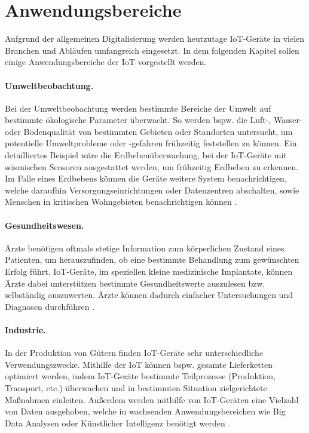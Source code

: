\section{Anwendungsbereiche}
Aufgrund der allgemeinen Digitalisierung werden heutzutage IoT-Geräte in 
vielen Branchen und Abläufen umfangreich eingesetzt. In dem folgenden Kapitel 
sollen einige Anwendungsbereiche der IoT vorgestellt werden. 

\paragraph{Umweltbeobachtung.}
Bei der Umweltbeobachtung werden bestimmte Bereiche der Umwelt auf bestimmte
ökologische Parameter überwacht.  So werden bspw. die Luft-, Wasser- oder
Bodenqualität von bestimmten Gebieten oder Standorten untersucht, um potentielle
Umweltprobleme oder -gefahren frühzeitig feststellen zu können.  Ein
detailliertes Beispiel wäre die Erdbebenüberwachung, bei der IoT-Geräte mit
seismischen Sensoren ausgestattet werden, um frühzeitig Erdbeben zu erkennen. Im
Falle eines Erdbebens können die Geräte weitere System benachrichtigen, welche
daraufhin Versorgungseinrichtungen oder  Datenzentren abschalten, sowie Menschen
in kritischen Wohngebieten benachrichtigen können \cite{paper}.

\paragraph{Gesundheitswesen.}
Ärzte benötigen oftmals stetige Information zum kör\-per\-lich\-en Zustand eines
Patienten, um herauszufinden, ob eine bestimmte Behandlung zum
gewünschten Erfolg führt. IoT-Geräte, im speziellen kleine medizinische
Implantate, können Ärzte dabei unterstützen bestimmte Gesundheitswerte
auszulesen bzw.  selbständig auszuwerten. Ärzte können dadurch einfacher
Untersuchungen und Diagnosen durchführen \cite{paper}.

\paragraph{Industrie.}
In der Produktion von Gütern finden IoT-Geräte sehr unterschiedliche
Verwendungszwecke. Mithilfe der IoT können bspw. gesamte Lieferketten optimiert
werden, indem IoT-Geräte bestimmte Teilprozesse (Produktion, Transport, etc.)
überwachen und in bestimmten Situation zielgerichtete Maßnahmen einleiten.
Außerdem werden mithilfe von IoT-Geräten eine Vielzahl von Daten ausgehoben,
welche in wachsenden Anwendungsbereichen wie Big Data Analysen oder Künstlicher
Intelligenz benötigt werden \cite{paper}.

